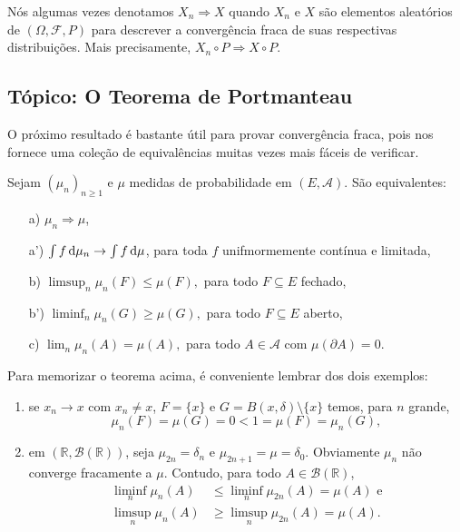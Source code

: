 Nós algumas vezes denotamos $X_n \Rightarrow X$ quando $X_n$ e $X$ são elementos aleatórios de $(\Omega, \mathcal{F}, P)$ para descrever a convergência fraca de suas respectivas distribuições.
Mais precisamente, $X_n \circ P \Rightarrow X \circ P$.

\begin{topics}
  \section{Tópico: O Teorema de Portmanteau}

  O próximo resultado é bastante útil para provar convergência fraca, pois nos fornece uma coleção de equivalências muitas vezes mais fáceis de verificar.

  \begin{theorem}
    \label{t:portmanteau}
    Sejam $(\mu_n)_{n \geq 1}$ e $\mu$ medidas de probabilidade em $(E, \mathcal{A})$.
    São equivalentes:
    \begin{enumerate}[\quad a)]
    \item[a)] $\mu_n \Rightarrow \mu$,
    \item[a')] $\int f \mathop{}\!\mathrm{d} \mu_n \to \int f \mathop{}\!\mathrm{d} \mu$, para toda $f$ unifmormemente contínua e limitada,
    \item[b)] $\limsup_n \mu_n(F) \leq \mu(F),$ para todo $F \subseteq E$ fechado,
    \item[b')] $\liminf_n \mu_n(G) \geq \mu(G),$ para todo $F \subseteq E$ aberto,
    \item[c)] $\lim_n \mu_n(A) = \mu(A),$ para todo $A \in \mathcal{A}$ com $\mu(\partial A) = 0$.
    \end{enumerate}
  \end{theorem}

  Para memorizar o teorema acima, é conveniente lembrar dos dois exemplos:
  \begin{enumerate}[\quad i)]
    \item se $x_n \to x$ com $x_n \neq x$, $F = \{x\}$ e $G = B(x, \delta) \setminus \{x\}$ temos, para $n$ grande,
      \begin{equation}
        \mu_n(F) = \mu(G) = 0 < 1 = \mu(F) = \mu_n(G),
      \end{equation}
    \item em $(\mathbb{R},\mathcal{B}(\mathbb{R}))$, seja $\mu_{2n} = \delta_n$ e $\mu_{2n+1} = \mu = \delta_0$.
      Obviamente $\mu_n$ não converge fracamente a $\mu$. Contudo, para todo $A \in \mathcal{B}(\mathbb{R})$,
      \begin{equation}
        \begin{split}
          \liminf_n \mu_n (A) & \leq \liminf_n \mu_{2n}(A) = \mu(A) \text{ e}\\
          \limsup_n \mu_n (A) & \geq \limsup_n \mu_{2n}(A) = \mu(A).
        \end{split}
      \end{equation}
  \end{enumerate}


\end{topics}

